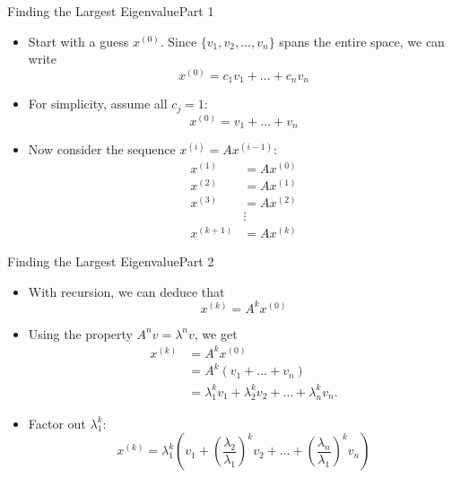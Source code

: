 \documentclass[10pt]{beamer}
\begin{document}

\begin{frame}{Finding the Largest Eigenvalue}{Part 1}
\begin{itemize}
    \item Start with a guess \( x^{(0)} \). Since \( \{v_1, v_2, \ldots, v_n\} \) spans the entire space, we can write
    \[
    x^{(0)} = c_1 v_1 + \dots + c_n v_n
    \]
    \item For simplicity, assume all \( c_j = 1 \):
    \[
    x^{(0)} = v_1 + \dots + v_n
    \]
    \item Now consider the sequence $x^{(i)} = A x^{(i-1)}$:
    \begin{align*}
        x^{(1)} &= A x^{(0)} \\
        x^{(2)} &= A x^{(1)} \\
        x^{(3)} &= A x^{(2)} \\
        &\vdots \\
        x^{(k+1)} &= A x^{(k)}
    \end{align*}
\end{itemize}
\end{frame}


\begin{frame}{Finding the Largest Eigenvalue}{Part 2}
\begin{itemize}
    \item With recursion, we can deduce that 
    $$
    x^{(k)} = A^k x^{(0)}
    $$
    \item Using the property $ A^nv = \lambda^n v$, we get
    \begin{align*}
        x^{(k)} &= A^k x^{(0)} \\
                &= A^k ( v_1 + \dots + v_n) \\
                &= \lambda_1^k v_1 + \lambda_2^k v_2 + \dots + \lambda_n^k v_n.
    \end{align*}
    \item Factor out \( \lambda_1^k \):
    \[
    x^{(k)} = \lambda_1^k \left( v_1 + \left(\frac{\lambda_2}{\lambda_1}\right)^k v_2 + \dots + \left(\frac{\lambda_n}{\lambda_1}\right)^k v_n \right)
    \]
        
\end{itemize}
\end{frame}
\end{document}
